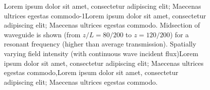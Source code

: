 \begin{figure}
\vskip -0.5cm
\centerline{
}
\vskip -0.5cm
\caption[Lorem ipsum dolor sit amet, consectetur adipiscing elit; Maecenas ultrices egestas commodo-1Lorem ipsum dolor sit amet, consectetur adipiscing elit; Maecenas ultrices egestas commodo.]{Lorem ipsum dolor sit amet, consectetur adipiscing elit; Maecenas ultrices egestas commodo-1Lorem ipsum dolor sit amet, consectetur adipiscing elit; Maecenas ultrices egestas commodo. Midsection of waveguide is shown (from $z/L=80/200$ to $z=120/200$) for a resonant frequency (higher than average transmission). Spatially varying field intensity (with continuous wave incident flux)Lorem ipsum dolor sit amet, consectetur adipiscing elit; Maecenas ultrices egestas commodo,Lorem ipsum dolor sit amet, consectetur adipiscing elit; Maecenas ultrices egestas commodo.
\label{fig:electric_field_zoomed}}
\end{figure}

